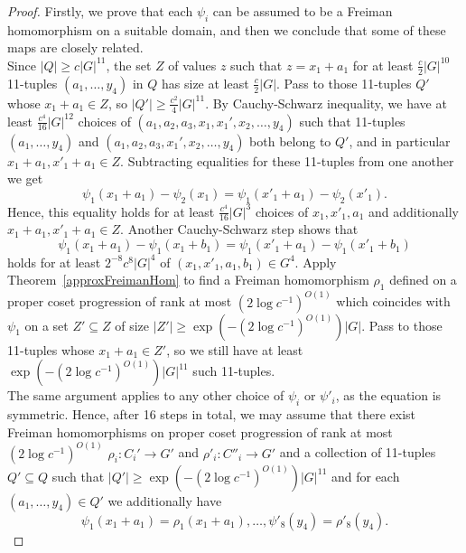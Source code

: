 \documentclass[a4paper,11pt]{article}
\numberwithin{theorem}{section}
\theoremstyle{definition}
\begin{document}
\begin{proof}
    Firstly, we prove that each $\psi_i$ can be assumed to be a Freiman homomorphism on a suitable domain, and then we conclude that some of these maps are closely related.\\
    Since $|Q| \geq c |G|^{11}$, the set $Z$ of values $z$ such that $z = x_1 + a_1$ for at least $\frac{c}{2}|G|^{10}$ 11-tuples $(a_1, \dots, y_4)$ in $Q$ has size at least $\frac{c}{2}|G|$. Pass to those 11-tuples $Q'$ whose $x_1 + a_1 \in Z$, so $|Q'| \geq \frac{c^2}{4}|G|^{11}$. By Cauchy-Schwarz inequality, we have at least $\frac{c^4}{16}|G|^{12}$ choices of $(a_1, a_2, a_3, x_1, x_1', x_2, \dots, y_4)$ such that 11-tuples $(a_1, \dots, y_4)$ and $(a_1, a_2, a_3, x_1', x_2, \dots, y_4)$ both belong to $Q'$, and in particular $x_1 + a_1, x'_1 + a_1 \in Z$. Subtracting equalities for these 11-tuples from one another we get
    \[\psi_1(x_1 + a_1) - \psi_2(x_1) = \psi_1(x'_1 + a_1) - \psi_2(x'_1).\]
    Hence, this equality holds for at least $\frac{c^4}{16}|G|^{3}$ choices of $x_1, x'_1, a_1$ and additionally $x_1 + a_1, x'_1 + a_1 \in Z$. Another Cauchy-Schwarz step shows that
    \[\psi_1(x_1 + a_1) - \psi_1(x_1 + b_1) = \psi_1(x'_1 + a_1) - \psi_1(x'_1 + b_1)\]
    holds for at least $2^{-8}c^8 |G|^{4}$ of $(x_1, x'_1, a_1, b_1) \in G^4$. Apply Theorem~\ref{approxFreimanHom} to find a Freiman homomorphism $\rho_1$ defined on a proper coset progression of rank at most $(2\log c^{-1})^{O(1)}$ which coincides with $\psi_1$ on a set $Z' \subseteq Z$ of size $|Z'| \geq \exp(-(2\log c^{-1})^{O(1)})|G|$. Pass to those 11-tuples whose $x_1 + a_1 \in Z'$, so we still have at least $\exp(-(2\log c^{-1})^{O(1)})|G|^{11}$ such 11-tuples.\\

    The same argument applies to any other choice of $\psi_i$ or $\psi'_i$, as the equation is symmetric. Hence, after 16 steps in total, we may assume that there exist Freiman homomorphisms on proper coset progression of rank at most $(2\log c^{-1})^{O(1)}$ $\rho_i : C_i'\to G'$ and $\rho'_i : C''_i \to G'$ and a collection of 11-tuples $Q' \subseteq Q$ such that $|Q'| \geq \exp(-(2\log c^{-1})^{O(1)})|G|^{11}$ and for each $(a_1, \dots, y_4) \in Q'$ we additionally have
    \[\psi_1(x_1 + a_1) = \rho_1(x_1 + a_1), \dots, \psi'_8(y_4) = \rho'_8(y_4).\]


\end{proof}
\end{document}
